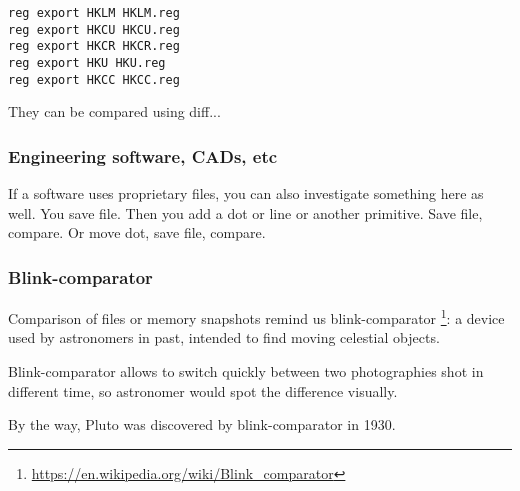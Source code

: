 \begin{lstlisting}
reg export HKLM HKLM.reg
reg export HKCU HKCU.reg
reg export HKCR HKCR.reg
reg export HKU HKU.reg
reg export HKCC HKCC.reg
\end{lstlisting}

They can be compared using diff...

\subsubsection{Engineering software, CADs, etc}

If a software uses proprietary files, you can also investigate something here as well.
You save file.
Then you add a dot or line or another primitive.
Save file, compare.
Or move dot, save file, compare.

\subsubsection{Blink-comparator}

Comparison of files or memory snapshots remind us blink-comparator
\footnote{\url{https://en.wikipedia.org/wiki/Blink_comparator}}:
a device used by astronomers in past, intended to find moving celestial objects.

Blink-comparator allows to switch quickly between two photographies shot in different time,
so astronomer would spot the difference visually.

By the way, Pluto was discovered by blink-comparator in 1930.

